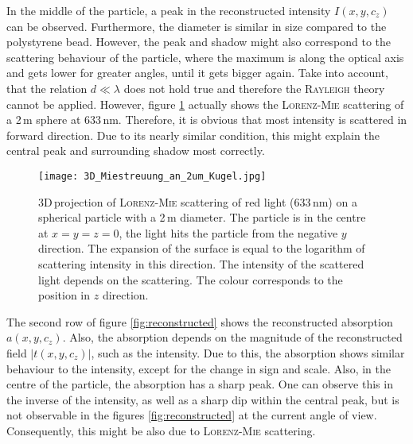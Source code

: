 \documentclass{article}
\begin{document}
In the middle of the particle, a peak in the reconstructed intensity $I(x,y,c_z)$ can be observed. Furthermore, the diameter is similar in size compared to the polystyrene bead. However, the peak and shadow might also correspond to the scattering behaviour of the particle, where the maximum is along the optical axis and gets lower for greater angles, until it gets bigger again. Take into account, that the relation $d\ll\lambda$ does not hold true and therefore the \textsc{Rayleigh} theory cannot be applied. However, figure \ref{fig:wikiMie} actually shows the \textsc{Lorenz}-\textsc{Mie} scattering of a 2\,\textmu m sphere at 633\,nm. Therefore, it is obvious that most intensity is scattered in forward direction. Due to its nearly similar condition, this might explain the central peak and surrounding shadow most correctly. %
\begin{figure}
    \centering
    \texttt{[image: 3D\_Miestreuung\_an\_2um\_Kugel.jpg]}
    \caption{3D\,projection of \textsc{Lorenz}-\textsc{Mie} scattering of red light (633\,nm) on a spherical particle with a 2\,\textmu m diameter. The particle is in the centre at $x=y=z=0$, the light hits the particle from the negative $y$ direction. The expansion of the surface is equal to the logarithm of scattering intensity in this direction. The intensity of the scattered light depends on the scattering. The colour corresponds to the position in $z$ direction. \cite{wikiMie}}
    \label{fig:wikiMie}
\end{figure}

The second row of figure \ref{fig:reconstructed} shows the reconstructed absorption\\$a(x,y,c_z)$. Also, the absorption depends on the magnitude of the reconstructed field $|t(x,y,c_z)|$, such as the intensity. Due to this, the absorption shows similar behaviour to the intensity, except for the change in sign and scale. Also, in the centre of the particle, the absorption has a sharp peak. One can observe this in the inverse of the intensity, as well as a sharp dip within the central peak, but is not observable in the figures \ref{fig:reconstructed} at the current angle of view. Consequently, this might be also due to \textsc{Lorenz}-\textsc{Mie} scattering. 
\end{document}
